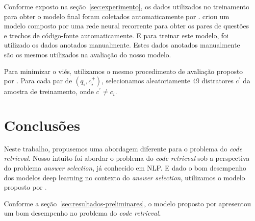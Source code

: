 \documentclass[12pt]{article}
\begin{document}
Conforme exposto na seção~\ref{sec:experimento}, os dados utilizados no treinamento para obter o modelo final foram coletados automaticamente por \cite{Yao-staqc:2018}. \cite{Yao-staqc:2018} criou um modelo composto por uma rede neural recorrente para obter os pares de questões e trechos de código-fonte automaticamente. E para treinar este modelo, foi utilizado os dados anotados manualmente. Estes dados anotados manualmente são os mesmos utilizados na avaliação do nosso modelo. 

Para minimizar o viés, utilizamos o mesmo procedimento de avaliação proposto por \cite{iyer-etal-2016-summarizing}. Para cada par de $(q_{i}, c_{i}^{+})$, selecionamos aleatoriamente 49 distratores $c^{'}$ da amostra de treinamento, onde $c^{'} \neq c_{i}$. 

\section{Conclusões}

Neste trabalho, propusemos uma abordagem diferente para o problema do \textit{code retrieval}. Nosso intuito foi abordar o problema do \textit{code retrieval} sob a perspectiva do problema \textit{answer selection}, já conhecido em NLP. E dado o bom desempenho dos modelos deep learning no contexto do \textit{answer selection}, utilizamos o modelo proposto por \cite{tan-lstm-qa}.

Conforme a seção~\ref{sec:resultados-preliminares}, o modelo proposto por \cite{tan-lstm-qa} apresentou um bom desempenho no problema do \textit{code retrieval}. 





\end{document}
